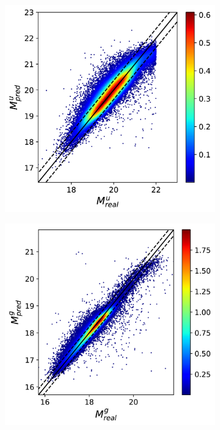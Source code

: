 \documentclass[12pt,letterpaper,twoside,openright]{book}
\begin{document}
\begin{figure}[]
  \begin{subfigure}[b]{0.3\textwidth}
    \includegraphics[width=\textwidth, height = \textwidth]{Figures/pmu3.png}
    \label{fig:1}
  \end{subfigure}
  \hspace{0cm}
  \begin{subfigure}[b]{0.3\textwidth}
    \includegraphics[width=\textwidth, height = \textwidth]{Figures/pmg3.png}

\end{subfigure}
\end{figure}
\end{document}
